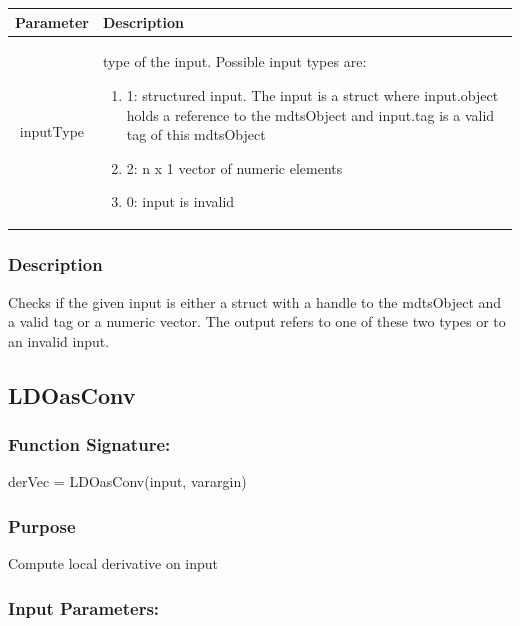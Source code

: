 \documentclass[a4]{scrreprt}
\begin{document}
\begin{longtabu} to \textwidth {|c|X|}
	\hline
	\textbf{Parameter} & \textbf{Description} \\ \hline
	\endhead
	inputType & type of the input. Possible input types are: 
				\begin{enumerate}
					\item 1: structured input. The input is a struct where input.object holds a reference to the mdtsObject and input.tag is a valid tag of this mdtsObject
					\item 2: n x 1 vector of numeric elements
					\item 0: input is invalid
				\end{enumerate} \\ \hline
\end{longtabu}

\subsubsection{Description}

Checks if the given input is either a struct with a handle to the mdtsObject and a valid tag or a numeric vector. The output refers to one of these two types or to an invalid input.

\subsection{LDOasConv}

\subsubsection{Function Signature:}

\begin{center}
	derVec = LDOasConv(input, varargin)
\end{center}

\subsubsection{Purpose}

Compute local derivative on input

\subsubsection{Input Parameters:}
\end{document}
